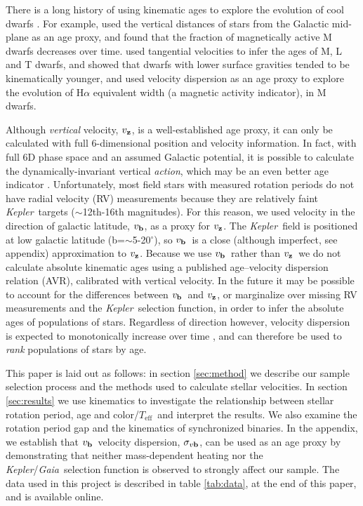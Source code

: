 \documentclass{aastex63}
\newcommand{\eg}{{\it e.g.}}
\newcommand{\kepler}{{\it Kepler}}
\newcommand{\gaia}{{\it Gaia}}
\newcommand{\teff}{$T_{\mathrm{eff}}$}
\newcommand{\degrees}{$^\circ$}
\newcommand{\vz}{$v_{\bf z}$}
\newcommand{\vb}{$v_{\bf b}$}
\newcommand{\sigmavb}{$\sigma_{v{\bf b}}$}
\newcommand{\racomment}[1]{{\color{black}#1}}
\begin{document}
\racomment{There is a long history of using kinematic ages to explore the
evolution of cool dwarfs \citep[\eg][]{reid1995, gizis2000, west2004,
west2006, schmidt2007, faherty2009, kiman2019}.
For example, \citet{west2004, west2006} used the vertical distances of stars
from the Galactic mid-plane as an age proxy, and found that the fraction of
magnetically active M dwarfs decreases over time.
\citet{faherty2009} used tangential velocities to infer the ages of M, L and T
dwarfs, and showed that dwarfs with lower surface gravities tended to be
kinematically younger, and \citet{kiman2019} used velocity dispersion as an
age proxy to explore the evolution of H$\alpha$ equivalent width (a magnetic
activity indicator), in M dwarfs.
}

Although {\it vertical} velocity, \vz, is \racomment{a well-established} age
proxy, it can only be calculated with full 6-dimensional position and velocity
information.
In fact, with full 6D phase space and an assumed Galactic potential, it is
possible to calculate the dynamically-invariant vertical {\it action}, which may
be an even better age indicator \citep{beane2018, ting2019}.
Unfortunately, most field stars with measured rotation periods do not have
radial velocity (RV) measurements because they are relatively faint \kepler\
targets ($\sim$12th-16th magnitudes).
For this reason, we used velocity in the direction of galactic latitude, \vb,
as a proxy for \vz.
The \kepler\ field is positioned at low galactic latitude
(b=$\sim$5-20\degrees), so \vb\ is a close (although imperfect, see
appendix) approximation to \vz.
Because we use \vb\ rather than \vz\, we do not calculate absolute kinematic
ages using a published age--velocity dispersion relation (AVR), calibrated with
vertical velocity.
In the future it may be possible to account for the differences between \vb\
and \vz, or marginalize over missing RV measurements and the \kepler\
selection function, in order to infer the absolute ages of populations of
stars.
Regardless of direction however, velocity dispersion is expected to
monotonically increase over time \citep[\eg][]{holmberg2009}, and can
therefore be used to {\it rank} populations of stars by age.

This paper is laid out as follows: in section \ref{sec:method} we describe our
sample selection process and the methods used to calculate stellar
velocities.
In section \ref{sec:results} we use kinematics to investigate the relationship
between stellar rotation period, age and color/\teff\ and interpret the
results.
We also examine the rotation period gap and the kinematics of synchronized
binaries.
In the appendix, we establish that \vb\ velocity dispersion, \sigmavb, can be
used as an age proxy by demonstrating that neither mass-dependent heating nor
the \kepler/\gaia\ selection function is observed to strongly affect our
sample.
The data used in this project is described in table \ref{tab:data}, at the end
of this paper, and is available online.
\end{document}
